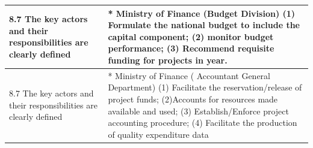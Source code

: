 \documentclass[
  10pt,
]{book}
\begin{document}
\begin{table}
\begin{tabular}[t]{l|l}
\hline
8.7 The key actors and their responsibilities are clearly defined & * Ministry of Finance (Budget Division) (1) Formulate the national budget to include the capital component; (2) monitor budget performance; (3) Recommend requisite funding for projects in year.\\
\hline
8.7 The key actors and their responsibilities are clearly defined & * Ministry of Finance ( Accountant General Department) (1) Facilitate the reservation/release of project funds; (2)Accounts for resources made available and used; (3) Establish/Enforce project accounting procedure; (4) Facilitate the production of quality expenditure data\\
\hline
\end{tabular}
\end{table}

\begin{table}


\end{table}
\end{document}
